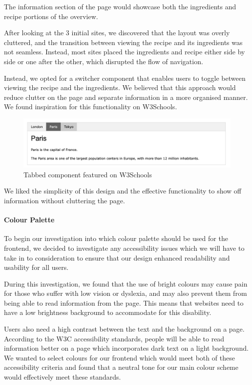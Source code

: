 \documentclass{article}
\begin{document}
The information section of the page would showcase both the ingredients and
recipe portions of the overview.

After looking at the 3 initial sites, we discovered that the layout was overly
cluttered, and the transition between viewing the recipe and its ingredients
was not seamless. Instead, most sites placed the ingredients and recipe either
side by side or one after the other, which disrupted the flow of navigation.

Instead, we opted for a switcher component that enables users to toggle between
viewing the recipe and the ingredients. We believed that this approach would
reduce clutter on the page and separate information in a more organised manner.
We found inspiration for this functionality on W3Schools.

\begin{figure}[h]
  \includegraphics[width=1.0\textwidth]{assets/design-images/W3Schools tabbed component.png}
  \centering
  \caption{Tabbed component featured on W3Schools}
\end{figure}

We liked the simplicity of this design and the effective functionality to show
off information without cluttering the page.

\paragraph{Colour Palette}
To begin our investigation into which colour palette should be used for the
frontend, we decided to investigate any accessibility issues which we will have
to take in to consideration to ensure that our design enhanced readability and
usability for all users.

During this investigation, we found that the use of bright colours may cause
pain for those who suffer with low vision or dyslexia, and may also prevent
them from being able to read information from the page. This means that
websites need to have a low brightness background to accommodate for this
disability.

Users also need a high contrast between the text and the background on a page.
According to the W3C accessibility standards, people will be able to read
information better on a page which incorporates dark text on a light
background. We wanted to select colours for our frontend which would meet both
of these accessibility criteria and found that a neutral tone for our main
colour scheme would effectively meet these standards.
\end{document}
